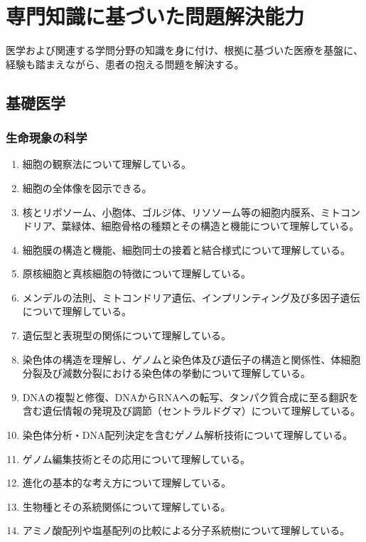 \hypertarget{ux5c02ux9580ux77e5ux8b58ux306bux57faux3065ux3044ux305fux554fux984cux89e3ux6c7aux80fdux529b}{%
\section{専門知識に基づいた問題解決能力}\label{ux5c02ux9580ux77e5ux8b58ux306bux57faux3065ux3044ux305fux554fux984cux89e3ux6c7aux80fdux529b}}

医学および関連する学問分野の知識を身に付け、根拠に基づいた医療を基盤に、経験も踏まえながら、患者の抱える問題を解決する。

\hypertarget{ux57faux790eux533bux5b66}{%
\subsection{基礎医学}\label{ux57faux790eux533bux5b66}}

\hypertarget{ux751fux547dux73feux8c61ux306eux79d1ux5b66}{%
\subsubsection{生命現象の科学}\label{ux751fux547dux73feux8c61ux306eux79d1ux5b66}}

\begin{enumerate}
\def\labelenumi{\arabic{enumi}.}
\tightlist
\item
  細胞の観察法について理解している。
\item
  細胞の全体像を図示できる。
\item
  核とリボソーム、小胞体、ゴルジ体、リソソーム等の細胞内膜系、ミトコンドリア、葉緑体、細胞骨格の種類とその構造と機能について理解している。
\item
  細胞膜の構造と機能、細胞同士の接着と結合様式について理解している。
\item
  原核細胞と真核細胞の特徴について理解している。
\item
  メンデルの法則、ミトコンドリア遺伝、インプリンティング及び多因子遺伝について理解している。
\item
  遺伝型と表現型の関係について理解している。
\item
  染色体の構造を理解し、ゲノムと染色体及び遺伝子の構造と関係性、体細胞分裂及び減数分裂における染色体の挙動について理解している。
\item
  DNAの複製と修復、DNAからRNAへの転写、タンパク質合成に至る翻訳を含む遺伝情報の発現及び調節（セントラルドグマ）について理解している。
\item
  染色体分析・DNA配列決定を含むゲノム解析技術について理解している。
\item
  ゲノム編集技術とその応用について理解している。
\item
  進化の基本的な考え方について理解している。
\item
  生物種とその系統関係について理解している。
\item
  アミノ酸配列や塩基配列の比較による分子系統樹について理解している。
\end{enumerate}

